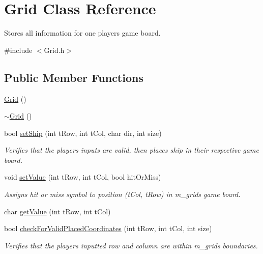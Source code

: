 \hypertarget{classGrid}{}\section{Grid Class Reference}
\label{classGrid}


Stores all information for one player\textquotesingle{}s game board.  




{\ttfamily \#include $<$Grid.\+h$>$}

\subsection*{Public Member Functions}
\begin{DoxyCompactItemize}
\item 
\hyperlink{classGrid_a4ac9ff4f63552b4c61ff90fcb35ad66c}{Grid} ()
\item 
\hyperlink{classGrid_a3661d0a7f998caaaf8627d7a67072116}{$\sim$\+Grid} ()
\item 
bool \hyperlink{classGrid_ae1ab8719d4320fce79999814ebd03e18}{set\+Ship} (int t\+Row, int t\+Col, char dir, int size)
\begin{DoxyCompactList}\small\item\em Verifies that the player\textquotesingle{}s inputs are valid, then places ship in their respective game board. \end{DoxyCompactList}\item 
void \hyperlink{classGrid_a796dc2bc597170d3cba6c5c7ee0ef393}{set\+Value} (int t\+Row, int t\+Col, bool hit\+Or\+Miss)
\begin{DoxyCompactList}\small\item\em Assigns hit or miss symbol to position (t\+Col, t\+Row) in m\+\_\+grid\textquotesingle{}s game board. \end{DoxyCompactList}\item 
char \hyperlink{classGrid_a64f11b9d53d9a8706a6d1cc2c3054b57}{get\+Value} (int t\+Row, int t\+Col)
\item 
bool \hyperlink{classGrid_ae8e5adb59f1d2b5ada441a86949b4833}{check\+For\+Valid\+Placed\+Coordinates} (int t\+Row, int t\+Col, int size)
\begin{DoxyCompactList}\small\item\em Verifies that the player\textquotesingle{}s inputted row and column are within m\+\_\+grid\textquotesingle{}s boundaries. \end{DoxyCompactList}\item 

\end{DoxyCompactItemize}
